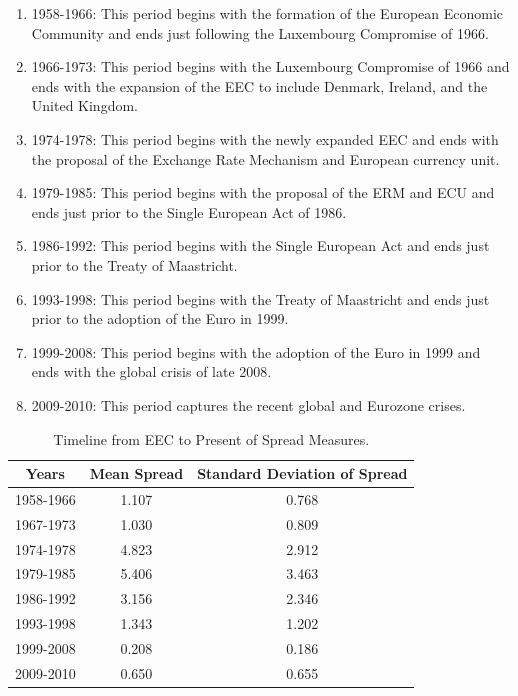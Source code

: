 \documentclass[3p]{elsarticle}
\begin{document}
\begin{enumerate}
	\item 1958-1966: This period begins with the formation of the European Economic Community and ends just following the Luxembourg Compromise of 1966.
	\item 1966-1973: This period begins with the Luxembourg Compromise of 1966 and ends with the expansion of the EEC to include Denmark, Ireland, and the United Kingdom.
	\item 1974-1978: This period begins with the newly expanded EEC and ends with the proposal of the Exchange Rate Mechanism and European currency unit.
	\item 1979-1985: This period begins with the proposal of the ERM and ECU and ends just prior to the Single European Act of 1986.
	\item 1986-1992: This period begins with the Single European Act and ends just prior to the Treaty of Maastricht.
	\item 1993-1998: This period begins with the Treaty of Maastricht and ends just prior to the adoption of the Euro in 1999.
	\item 1999-2008: This period begins with the adoption of the Euro in 1999 and ends with the global crisis of late 2008.
	\item 2009-2010: This period captures the recent global and Eurozone crises.
\end{enumerate}


\begin{table}[ht!]
	\centering
	\begin{tabular}{|c|c|c|}
		\hline
		\textbf{Years} & \textbf{Mean Spread} & \textbf{Standard Deviation of Spread}\\\hline
1958-1966 & 1.107 & 0.768\\\hline
1967-1973 & 1.030 & 0.809\\\hline
1974-1978 & 4.823 & 2.912\\\hline
1979-1985 & 5.406 & 3.463\\\hline
1986-1992 & 3.156 & 2.346\\\hline
1993-1998 & 1.343 & 1.202\\\hline
1999-2008 & 0.208 & 0.186\\\hline
2009-2010 & 0.650 & 0.655\\\hline
	\end{tabular}
	\caption{Timeline from EEC to Present of Spread Measures.}
	\label{tab:timeline_spread}
\end{table}
\end{document}
